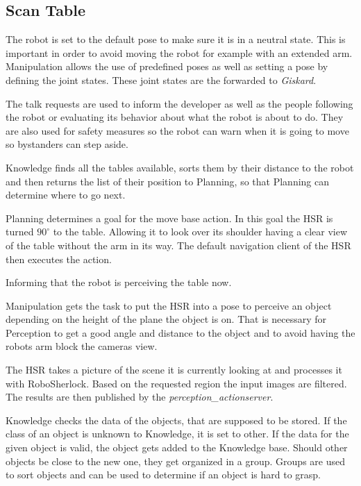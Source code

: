 \documentclass[main.tex]{subfiles}
\begin{document}
	\subsection{Scan Table}
	
	The robot is set to the default pose to make sure it is in a neutral state. This is important in order to avoid moving the robot for example with an extended arm. Manipulation allows the use of predefined poses as well as setting a pose by defining the joint states. These joint states are the forwarded to \textit{Giskard}.
	
	
	The talk requests are used to inform the developer as well as the people following the robot or evaluating its behavior about what the robot is about to do. They are also used for safety measures so the robot can warn when it is going to move so bystanders can step aside. 
	
	Knowledge finds all the tables available, sorts them by their distance to the robot and then returns the list of their position to Planning, so that Planning can determine where to go next.
	
	Planning determines a goal for the move base action. In this goal the HSR is turned $90^\circ$ to the table. Allowing it to look over its shoulder having a clear view of the table without the arm in its way. The default navigation client of the HSR then executes the action. 
	
	Informing that the robot is perceiving the table now.
	
	Manipulation gets the task to put the HSR into a pose to perceive an object depending on the height of the plane the object is on.
    That is necessary for Perception to get a good angle and distance to the object and to avoid having the robots arm block the cameras view.
	
	The HSR takes a picture of the scene it is currently looking at and processes it with RoboSherlock. Based on the requested region the input images are filtered. The results are then published by the \textit{perception\_actionserver}.
	
	Knowledge checks the data of the objects, that are supposed to be stored. If the class of an object is unknown to Knowledge, it is set to other. If the data for the given object is valid, the object gets added to the Knowledge base. Should other objects be close to the new one, they get organized in a group. Groups are used to sort objects and can be used to determine if an object is hard to grasp.
	
\end{document}
